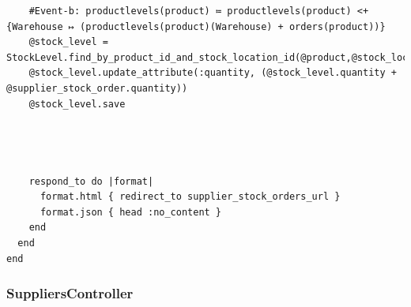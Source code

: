 \documentclass[a4paper]{article}
\begin{document}
\begin{verbatim}
    #Event-b: productlevels(product) ≔ productlevels(product) <+ {Warehouse ↦ (productlevels(product)(Warehouse) + orders(product))}
    @stock_level = StockLevel.find_by_product_id_and_stock_location_id(@product,@stock_location)
    @stock_level.update_attribute(:quantity, (@stock_level.quantity + @supplier_stock_order.quantity))
    @stock_level.save

 


    respond_to do |format|
      format.html { redirect_to supplier_stock_orders_url }
      format.json { head :no_content }
    end
  end
end

\end{verbatim}
\subsubsection{SuppliersController}
\end{document}
